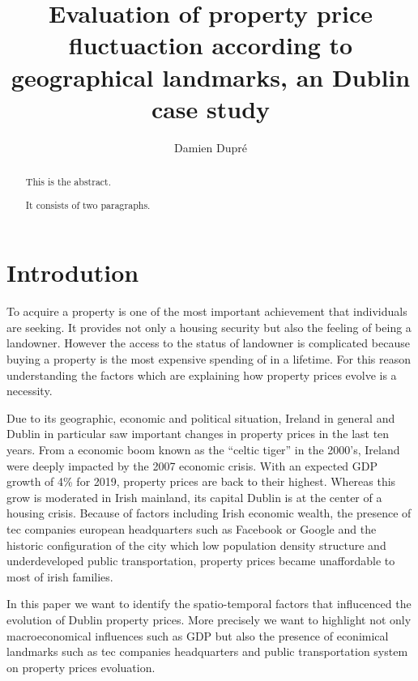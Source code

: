 \documentclass[]{elsarticle} %
\begin{document}
\begin{frontmatter}

  \title{Evaluation of property price fluctuaction according to geographical
landmarks, an Dublin case study}
    \author[Dublin City University]{Damien Dupré}
      \address[Dublin City University]{Business School, Glasnevin, Dublin 9, Ireland}
  
  \begin{abstract}
  This is the abstract.
  
  It consists of two paragraphs.
  \end{abstract}
  
 \end{frontmatter}

\section{Introdution}\label{introdution}

To acquire a property is one of the most important achievement that
individuals are seeking. It provides not only a housing security but
also the feeling of being a landowner. However the access to the status
of landowner is complicated because buying a property is the most
expensive spending of in a lifetime. For this reason understanding the
factors which are explaining how property prices evolve is a necessity.

Due to its geographic, economic and political situation, Ireland in
general and Dublin in particular saw important changes in property
prices in the last ten years. From a economic boom known as the ``celtic
tiger'' in the 2000's, Ireland were deeply impacted by the 2007 economic
crisis. With an expected GDP growth of 4\% for 2019, property prices are
back to their highest. Whereas this grow is moderated in Irish mainland,
its capital Dublin is at the center of a housing crisis. Because of
factors including Irish economic wealth, the presence of tec companies
european headquarters such as Facebook or Google and the historic
configuration of the city which low population density structure and
underdeveloped public transportation, property prices became
unaffordable to most of irish families.

In this paper we want to identify the spatio-temporal factors that
influcenced the evolution of Dublin property prices. More precisely we
want to highlight not only macroeconomical influences such as GDP but
also the presence of econimical landmarks such as tec companies
headquarters and public transportation system on property prices
evoluation.
\end{document}

